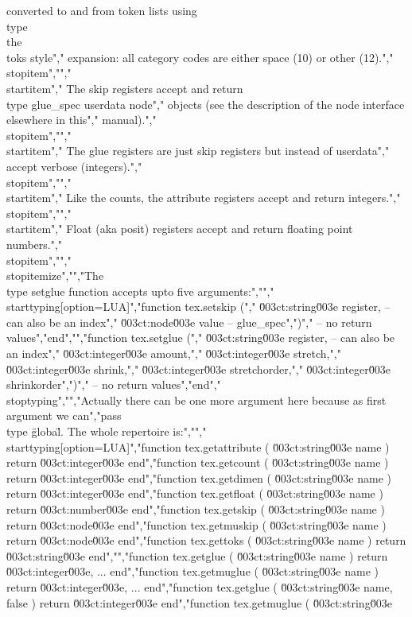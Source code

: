 converted to and from token lists using \\type {\\the \\toks} style","        expansion: all category codes are either space (10) or other (12).","    \\stopitem","","    \\startitem","        The skip registers accept and return \\type {glue_spec} userdata node","        objects (see the description of the node interface elsewhere in this","        manual).","    \\stopitem","","    \\startitem","        The glue registers are just skip registers but instead of userdata","        accept verbose (integers).","    \\stopitem","","    \\startitem","        Like the counts, the attribute registers accept and return integers.","    \\stopitem","","    \\startitem","        Float (aka posit) registers accept and return floating point numbers.","    \\stopitem","","\\stopitemize","","The \\type {setglue} function accepts upto five arguments:","","\\starttyping[option=LUA]","function tex.setskip (","    \u003ct:string\u003e register, -- can also be an index","    \u003ct:node\u003e   value     -- glue_spec",")","    -- no return values","end","","function tex.setglue (","    \u003ct:string\u003e  register, -- can also be an index","    \u003ct:integer\u003e amount,","    \u003ct:integer\u003e stretch,","    \u003ct:integer\u003e shrink,","    \u003ct:integer\u003e stretchorder,","    \u003ct:integer\u003e shrinkorder",")","    -- no return values","end","\\stoptyping","","Actually there can be one more argument here because as first argument we can","pass \\type {\"global\"}. The whole repertoire is:","","\\starttyping[option=LUA]","function tex.getattribute ( \u003ct:string\u003e name ) return \u003ct:integer\u003e end","function tex.getcount     ( \u003ct:string\u003e name ) return \u003ct:integer\u003e end","function tex.getdimen     ( \u003ct:string\u003e name ) return \u003ct:integer\u003e end","function tex.getfloat     ( \u003ct:string\u003e name ) return \u003ct:number\u003e  end","function tex.getskip      ( \u003ct:string\u003e name ) return \u003ct:node\u003e    end","function tex.getmuskip    ( \u003ct:string\u003e name ) return \u003ct:node\u003e    end","function tex.gettoks      ( \u003ct:string\u003e name ) return \u003ct:string\u003e  end","","function tex.getglue   ( \u003ct:string\u003e name        ) return \u003ct:integer\u003e, ... end","function tex.getmuglue ( \u003ct:string\u003e name        ) return \u003ct:integer\u003e, ... end","function tex.getglue   ( \u003ct:string\u003e name, false ) return \u003ct:integer\u003e end","function tex.getmuglue ( \u003ct:string\u003e 